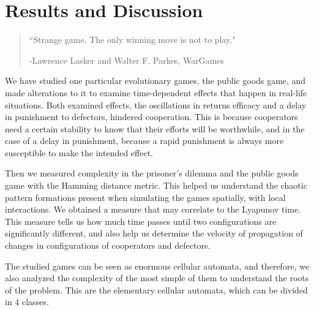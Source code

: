 \chapter{Results and Discussion}
\label{chap:Discussion}



\begin{quotation}
	\vspace{-3cm}
    \begin{flushright}
    \begin{minipage}[t][5cm][b]{0.5\textwidth}
    { ``Strange game. The only winning move is not to play."}
    
    \bigskip
    
    -{\small  Lawrence Lasker and Walter F. Parkes, WarGames}
    \end{minipage}
    \end{flushright}
    
    \vspace{0.5cm}
\end{quotation}





We have studied one particular evolutionary games, the public goods game, and made alterations to it to examine time-dependent effects that happen in real-life situations. Both examined effects, the oscillations in returns efficacy and a delay in punishment to defectors, hindered cooperation. This is because cooperators need a certain stability to know that their efforts will be worthwhile, and in the case of a delay in punishment, because a rapid punishment is always more susceptible to make the intended effect.

Then we measured complexity in the prisoner's dilemma and the public goods game with the Hamming distance metric. This helped us understand the chaotic pattern formations present when simulating the games spatially, with local interactions. We obtained a measure that may correlate to the Lyapunov time. This measure tells us how much time passes until two configurations are significantly different, and also help us determine the velocity of propagation of changes in configurations of cooperators and defectors.

The studied games can be seen as enormous cellular automata, and therefore, we also analyzed the complexity of the most simple of them to understand the roots of the problem. This are the elementary cellular automata, which can be divided in $4$ classes. 


